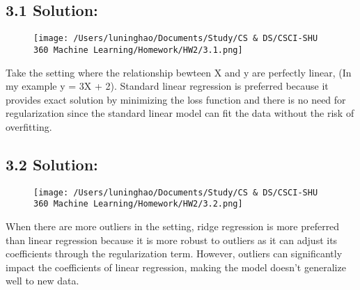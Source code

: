 \documentclass{article}
\begin{document}
\subsection*{3.1 Solution:}
\begin{figure}[h]
    \centering
    \texttt{[image: /Users/luninghao/Documents/Study/CS \& DS/CSCI-SHU 360 Machine Learning/Homework/HW2/3.1.png]}
\end{figure}
Take the setting where the relationship bewteen X and y are perfectly linear, (In my example y = 3X + 2). 
Standard linear regression is preferred because it provides exact solution by minimizing the loss function and there is no need for regularization since the standard linear model can fit the data without the risk of overfitting.



\subsection*{3.2 Solution:}
\begin{figure}[h]
    \centering
    \texttt{[image: /Users/luninghao/Documents/Study/CS \& DS/CSCI-SHU 360 Machine Learning/Homework/HW2/3.2.png]}
\end{figure}
When there are more outliers in the setting, ridge regression is more preferred than linear regression because it is more robust to outliers as it can adjust its coefficients through the regularization term.
However, outliers can significantly impact the coefficients of linear regression, making the model doesn't generalize well to new data.
\end{document}
